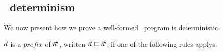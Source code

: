 %
%
%
%
%
%
%
%
%
%
%
%
%

\subsection{\fmsvcode \ determinism}

We now present  how we prove a well-formed \fmsvcode \  program is deterministic.\\

\begin{defi}
	$\vec a$ is a $prefix$ of $\vec a'$, written $\vec a \sqsubseteq \vec a'$, if one of the following rules applys: \\
	
	\emph{}
	\\
	
\end{defi}

